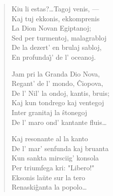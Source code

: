 \begin{verse}
                     Kiu li estas?\dots Tagoj venis, ---\\
                     Kaj tuj ekkonis, ekkomprenis\\
                     La Dion Novan Egiptanoj;\\
                     Sed per turmentoj, malagrabloj\\
                     De la dezert' en brulaj sabloj,\\
                     En profunda\^{\j}' de l' oceanoj.

                     Jam pri la Granda Dio Nova,\\
                     Regant' de l' mondo, \^Ciopova,\\
                     De l' Nil' la ondoj, kantis, bruis;\\
                     Kaj kun tondrego kaj ventegoj\\
                     Inter granitaj la \^stonegoj\\
                     De l' maro ond' kantante fluis\dots

                     Kaj resonante al la kanto\\
                     De l' mar' senfunda kaj bruanta\\
                     Kun sankta mirsciig' konsola\\
                     Per triumfega kri: "Libero!"\\
                     Eksonis la\u ute sur la tero\\
                     Renaski\^ganta la popolo\dots

\end{verse}



\smallrule{}

